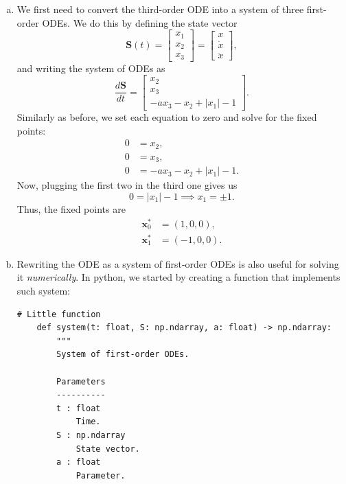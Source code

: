 \begin{enumerate}[(a)]
    \item We first need to convert the third-order ODE into a system of three first-order ODEs. 
    We do this by defining the state vector
    \[
        \textbf{S}(t) = \begin{bmatrix}
            x_1\\
            x_2\\
            x_3
        \end{bmatrix} = \begin{bmatrix}
            x\\
            \dot{x}\\
            \ddot{x}
        \end{bmatrix},
    \]
    and writing the system of ODEs as
    \[
        \frac{d\textbf{S}}{dt} = \begin{bmatrix}
            x_2\\
            x_3\\
            -a x_3 - x_2 + |x_1| - 1
        \end{bmatrix}.
    \]
    Similarly as before, we set each equation to zero and solve for the fixed points:
    \[
        \begin{aligned}
            0 &= x_2,\\
            0 &= x_3,\\
            0 &= -a x_3 - x_2 + |x_1| - 1.
        \end{aligned}
    \]
    Now, plugging the first two in the third one gives us
    \[
        0 = |x_1| - 1 \implies x_1 = \pm 1.
    \]
    Thus, the fixed points are
    \[\boxed{
        \begin{aligned}
            \textbf{x}_0^* &= (1, 0, 0),\\
            \textbf{x}_1^* &= (-1, 0, 0).
        \end{aligned}
    }
    \]

    \item Rewriting the ODE as a system of first-order ODEs
    is also useful for solving it \textit{numerically}. In python, we started by creating 
    a function that implements such system:

    \begin{lstlisting}[style=pythonstyle]
    # Little function
    def system(t: float, S: np.ndarray, a: float) -> np.ndarray:
        """
        System of first-order ODEs.

        Parameters
        ----------
        t : float
            Time.
        S : np.ndarray
            State vector.
        a : float
            Parameter.


\end{lstlisting}
\end{enumerate}
